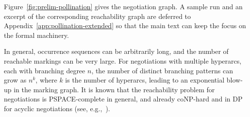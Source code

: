 Figure~\ref{fig:prelim-pollination} gives the negotiation graph. A sample run and
an excerpt of the corresponding reachability graph are deferred to
Appendix~\ref{app:pollination-extended} so that the main text can keep the focus
on the formal machinery.

In general, occurrence sequences can be arbitrarily long, and the number of reachable markings can be very large. For negotiations with multiple hyperarcs, each with branching degree \(n\), the number of distinct branching patterns can grow as \(n^k\), where \(k\) is the number of hyperarcs, leading to an exponential blow-up in the marking graph. It is known that the reachability problem for negotiations is PSPACE-complete in general, and already coNP-hard and in DP for acyclic negotiations (see, e.g.,~\cite{EsparzaDeselNegotiations}).

